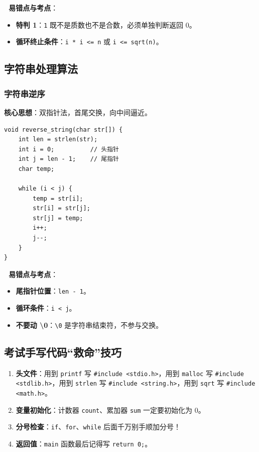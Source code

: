 \documentclass[a4paper,12pt]{article}
\begin{document}
\textbf{🔴 易错点与考点}：
\begin{itemize}
    \item \textbf{特判 1}：\texttt{1} 既不是质数也不是合数，必须单独判断返回 0。
    \item \textbf{循环终止条件}：\texttt{i * i <= n} 或 \texttt{i <= sqrt(n)}。
\end{itemize}

\subsection{字符串处理算法}

\subsubsection{字符串逆序}
\textbf{核心思想}：双指针法，首尾交换，向中间逼近。

\begin{lstlisting}
void reverse_string(char str[]) {
    int len = strlen(str);
    int i = 0;          // 头指针
    int j = len - 1;    // 尾指针
    char temp;
    
    while (i < j) {
        temp = str[i];
        str[i] = str[j];
        str[j] = temp;
        i++;
        j--;
    }
}
\end{lstlisting}

\textbf{🔴 易错点与考点}：
\begin{itemize}
    \item \textbf{尾指针位置}：\texttt{len - 1}。
    \item \textbf{循环条件}：\texttt{i < j}。
    \item \textbf{不要动 \textbackslash 0}：\texttt{\textbackslash 0} 是字符串结束符，不参与交换。
\end{itemize}

\subsection{考试手写代码“救命”技巧}
\begin{enumerate}
    \item \textbf{头文件}：用到 \texttt{printf} 写 \texttt{\#include <stdio.h>}，用到 \texttt{malloc} 写 \texttt{\#include <stdlib.h>}，用到 \texttt{strlen} 写 \texttt{\#include <string.h>}，用到 \texttt{sqrt} 写 \texttt{\#include <math.h>}。
    \item \textbf{变量初始化}：计数器 \texttt{count}、累加器 \texttt{sum} 一定要初始化为 0。
    \item \textbf{分号检查}：\texttt{if}、\texttt{for}、\texttt{while} 后面千万别手顺加分号！
    \item \textbf{返回值}：\texttt{main} 函数最后记得写 \texttt{return 0;}。
\end{enumerate}
\end{document}
